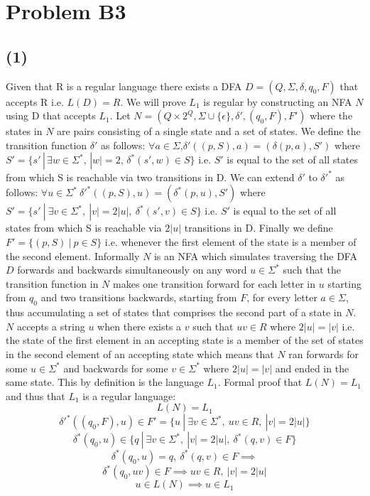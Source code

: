 \documentclass[12pt]{article}
\begin{document}
\section*{Problem B3}
\subsection*{(1)}
  Given that R is a regular language there exists a DFA
  $D = (Q, \Sigma, \delta, q_0, F)$ that accepts R i.e. $L(D) = R$.
  We will prove $L_1$ is regular by constructing
  an NFA $N$ using D that accepts $L_1$. Let $N = (Q \times 2^Q,
  \Sigma \cup \{\epsilon\}, \delta{'}, (q_0 , F), F')$ where the states in $N$
  are pairs consisting of a single state and a set of states. We define the
  transition function $\delta{'}$ as follows:
  \newline
  \indent $\forall a \in \Sigma$,\:$\delta{'}((p,S), a) = (\delta(p,a), S')$ where
  $S'= \{s'\,|\,\exists w \in \Sigma^*,\,|w| = 2,\, \delta^*(s',w) \in S\}$
  \newline
  \indent i.e. $S'$ is equal to the set of all states from which S is reachable
  via two transitions in D.
  \newline
  We can extend $\delta{'}$ to $\delta{'}^*$ as follows:
  \newline
  \indent $\forall u \in \Sigma^*\: \delta{'}^* ((p,S),u) = (\delta^* (p, u),S')$
  where $S' = \{s'\:|\:\exists v \in \Sigma^* ,\: |v|=2|u| ,\:
  \delta^* (s', v) \in S\}$
  \newline
  \indent i.e. $S'$ is equal to the set of all states from which S is reachable
  via $2|u|$ transitions in D.
  \newline
  Finally we define $F'=\{(p,S)\:|\: p \in S\}$ i.e. whenever the first element
  of the state is a member of the second element. Informally $N$ is an NFA which
  simulates traversing the DFA $D$ forwards and backwards simultaneously on any
  word $u \in \Sigma^*$ such that the transition function in $N$ makes one
  transition forward for each letter in $u$ starting from $q_0$ and two
  transitions backwards, starting from $F$, for every letter $a\in\Sigma$, thus
  accumulating a set of states that comprises the second part of a state in $N$.
  $N$ accepts a string $u$ when there exists a $v$ such that $uv \in R$ where
  $2|u| = |v|$ i.e. the state of the first element in an accepting state
  is a member of the set of states in the second element of an accepting state
  which means that $N$ ran forwards for some $u \in \Sigma^*$ and backwards for
  some $v \in \Sigma^*$ where $2|u| = |v|$ and ended in the same state.
  This by definition is the language $L_1$. Formal proof that $L(N) = L_1$ and
  thus that $L_1$ is a regular language:
  $$ L(N) = L_1 $$
  $$ \delta{'}^*((q_0, F), u) \in F' = \{u \:|\: \exists v \in \Sigma^* ,\:
  uv \in R ,\: |v| = 2|u|\}$$ 
  $$ \delta^*(q_0, u) \in \{q \:|\: \exists v \in \Sigma^* ,\:
  |v| = 2|u| ,\: \delta^*(q,v) \in F\}$$
  $$ \delta^*(q_0, u) = q ,\: \delta^*(q,v) \in F \implies$$
  $$\delta^*(q_0, uv) \in F \implies uv \in R ,\: |v| = 2|u|$$
  $$ u \in L(N) \implies u \in L_1$$
\end{document}
